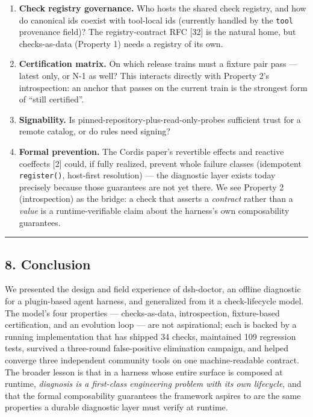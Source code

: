 \documentclass[
]{article}
\providecommand{\tightlist}{%
  \setlength{\itemsep}{0pt}\setlength{\parskip}{0pt}}
\begin{document}
\begin{enumerate}
\def\labelenumi{\arabic{enumi}.}
\tightlist
\item
  \textbf{Check registry governance.} Who hosts the shared check
  registry, and how do canonical ids coexist with tool-local ids
  (currently handled by the \texttt{tool} provenance field)? The
  registry-contract RFC {[}32{]} is the natural home, but checks-as-data
  (Property 1) needs a registry of its own.
\item
  \textbf{Certification matrix.} On which release trains must a fixture
  pair pass --- latest only, or N-1 as well? This interacts directly
  with Property 2's introspection: an anchor that passes on the current
  train is the strongest form of ``still certified''.
\item
  \textbf{Signability.} Is pinned-repository-plus-read-only-probes
  sufficient trust for a remote catalog, or do rules need signing?
\item
  \textbf{Formal prevention.} The Cordis paper's revertible effects and
  reactive coeffects {[}2{]} could, if fully realized, prevent whole
  failure classes (idempotent \texttt{register()}, host-first
  resolution) --- the diagnostic layer exists today precisely because
  those guarantees are not yet there. We see Property 2 (introspection)
  as the bridge: a check that asserts a \emph{contract} rather than a
  \emph{value} is a runtime-verifiable claim about the harness's own
  composability guarantees.
\end{enumerate}

\begin{center}\rule{0.5\linewidth}{0.5pt}\end{center}

\subsection{8. Conclusion}\label{conclusion}

We presented the design and field experience of dsh-doctor, an offline
diagnostic for a plugin-based agent harness, and generalized from it a
check-lifecycle model. The model's four properties --- checks-as-data,
introspection, fixture-based certification, and an evolution loop ---
are not aspirational; each is backed by a running implementation that
has shipped 34 checks, maintained 109 regression tests, survived a
three-round false-positive elimination campaign, and helped converge
three independent community tools on one machine-readable contract. The
broader lesson is that in a harness whose entire surface is composed at
runtime, \emph{diagnosis is a first-class engineering problem with its
own lifecycle}, and that the formal composability guarantees the
framework aspires to are the same properties a durable diagnostic layer
must verify at runtime.
\end{document}
